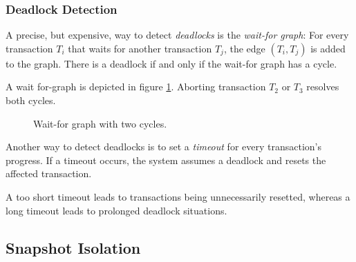 \subsubsection{Deadlock Detection}

A precise, but expensive, way to detect \emph{deadlocks} is the \emph{wait-for graph}: For every transaction $T_i$ that waits for another transaction $T_j$, the edge $(T_i,T_j)$ is added to the graph. There is a deadlock if and only if the wait-for graph has a cycle.

\begin{example}
A wait for-graph is depicted in figure \ref{fig_waitfor}. Aborting transaction $T_2$ or $T_3$ resolves both cycles.
\end{example}

\begin{figure}[htbp]
\begin{center}
\end{center}
\caption[Wait-For Graph]{Wait-for graph with two cycles.}
\label{fig_waitfor}
\end{figure}

Another way to detect deadlocks is to set a \emph{timeout} for every transaction's progress. If a timeout occurs, the system assumes a deadlock and resets the affected transaction.

A too short timeout leads to transactions being unnecessarily resetted, whereas a long timeout leads to prolonged deadlock situations.




\subsection{Snapshot Isolation}

